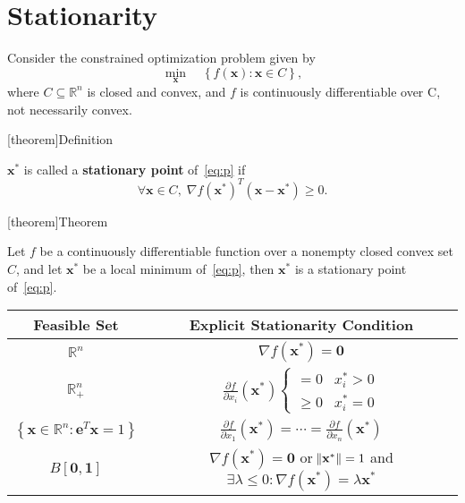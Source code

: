 \documentclass[12pt]{report}
\theoremstyle{definition}
\begin{document}
\section{Stationarity}

Consider the constrained optimization problem given by
\begin{equation}\label{eq:p}
    \tag{P}
    \underset{\mathbf{x}}{\min}\quad\left\{f(\mathbf{x}):\mathbf{x}\in C\right\},
\end{equation}
where $C\subseteq\mathbb{R}^{n}$ is closed and convex,
and $f$ is continuously differentiable over C, not necessarily convex.

[theorem]{Definition}
\begin{stationarity}
    $\mathbf{x}^*$ is called a \textbf{stationary point}
    of~\eqref{eq:p} if
    \[
        \forall \mathbf{x}\in C,\;
        \nabla f(\mathbf{x}^*)^T(\mathbf{x}-\mathbf{x}^*)\ge 0.
    \]
    
\end{stationarity}

[theorem]{Theorem}
\begin{stationarity as a necessary optimality condition}
    Let $f$ be a continuously differentiable function over a nonempty closed
    convex set $C$, and let $\mathbf{x}^*$ be a local minimum of~\eqref{eq:p},
    then $\mathbf{x}^*$ is a stationary point of~\eqref{eq:p}.
\end{stationarity as a necessary optimality condition}

\def\arraystretch{1.5}
\begin{table}[h]
    \centering
    \begin{tabular}{c|c}
        Feasible Set & Explicit Stationarity Condition \\
        \hline\hline
        $\mathbb{R}^{n}$ & $\nabla f(\mathbf{x}^*)=\mathbf{0}$ \\[4px]
        \hline
        $\mathbb{R}_+^n$ & $\frac{\partial f}{\partial x_i}(\mathbf{x}^*)
        \begin{cases}
            =0 & x_i^*>0 \\
            \ge 0 & x_i^*=0
        \end{cases}
        $ \\
        \hline
        $\left\{\mathbf{x}\in\mathbb{R}^{n}:\mathbf{e}^T\mathbf{x}=1\right\}$
                         & $\frac{\partial f}{\partial
                         x_1}(\mathbf{x}^*)=\cdots=\frac{\partial f}{\partial
                         x_n}(\mathbf{x}^*)$ \\
        \hline
        $B[\mathbf{0},\mathbf{1}]$ 
                         & $\nabla f(\mathbf{x}^*)=\mathbf{0}$ or
                         $\norm{\mathbf{x}^*}=1$ and $\exists \lambda\le
                         0:\nabla f(\mathbf{x}^*)=\lambda\mathbf{x}^*$
    \end{tabular} 
\end{table} 
\def\arraystretch{1.0}
\end{document}

